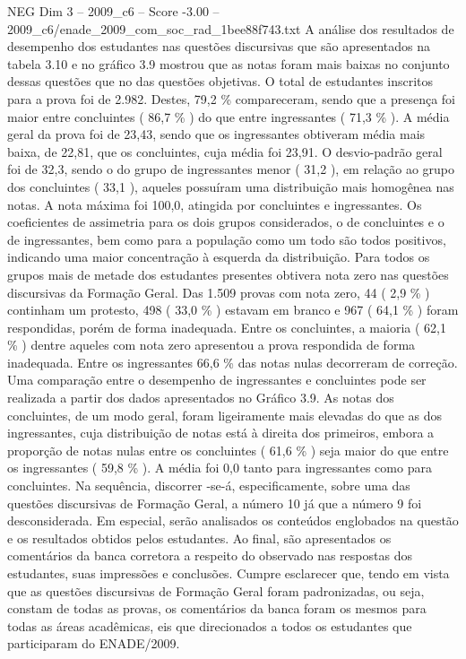 \begin{textsample}{NEG Dim 3 – 2009\_c6 – Score -3.00 – 2009\_c6/enade\_2009\_com\_soc\_rad\_1bee88f743.txt}
A análise dos resultados de desempenho dos estudantes nas questões discursivas que são apresentados na tabela 3.10 e no gráfico 3.9 mostrou que as notas foram mais baixas no conjunto dessas questões que no das questões objetivas.
O total de estudantes inscritos para a prova foi de 2.982.
Destes, 79,2 \% compareceram, sendo que a presença foi maior entre concluintes ( 86,7 \% ) do que entre ingressantes ( 71,3 \% ).
A média geral da prova foi de 23,43, sendo que os ingressantes obtiveram média mais baixa, de 22,81, que os concluintes, cuja média foi 23,91.
O desvio-padrão geral foi de 32,3, sendo o do grupo de ingressantes menor ( 31,2 ), em relação ao grupo dos concluintes ( 33,1 ), aqueles possuíram uma distribuição mais homogênea nas notas.
A nota máxima foi 100,0, atingida por concluintes e ingressantes.
Os coeficientes de assimetria para os dois grupos considerados, o de concluintes e o de ingressantes, bem como para a população como um todo são todos positivos, indicando uma maior concentração à esquerda da distribuição.
Para todos os grupos mais de metade dos estudantes presentes obtivera nota zero nas questões discursivas da Formação Geral.
Das 1.509 provas com nota zero, 44 ( 2,9 \% ) continham um protesto, 498 ( 33,0 \% ) estavam em branco e 967 ( 64,1 \% ) foram respondidas, porém de forma inadequada.
Entre os concluintes, a maioria ( 62,1 \% ) dentre aqueles com nota zero apresentou a prova respondida de forma inadequada.
Entre os ingressantes 66,6 \% das notas nulas decorreram de correção.
Uma comparação entre o desempenho de ingressantes e concluintes pode ser realizada a partir dos dados apresentados no Gráfico 3.9.
As notas dos concluintes, de um modo geral, foram ligeiramente mais elevadas do que as dos ingressantes, cuja distribuição de notas está à direita dos primeiros, embora a proporção de notas nulas entre os concluintes ( 61,6 \% ) seja maior do que entre os ingressantes ( 59,8 \% ).
A média foi 0,0 tanto para ingressantes como para concluintes.
Na sequência, discorrer -se-á, especificamente, sobre uma das questões discursivas de Formação Geral, a número 10 já que a número 9 foi desconsiderada.
Em especial, serão analisados os conteúdos englobados na questão e os resultados obtidos pelos estudantes.
Ao final, são apresentados os comentários da banca corretora a respeito do observado nas respostas dos estudantes, suas impressões e conclusões.
Cumpre esclarecer que, tendo em vista que as questões discursivas de Formação Geral foram padronizadas, ou seja, constam de todas as provas, os comentários da banca foram os mesmos para todas as áreas acadêmicas, eis que direcionados a todos os estudantes que participaram do ENADE/2009.

\end{textsample}
